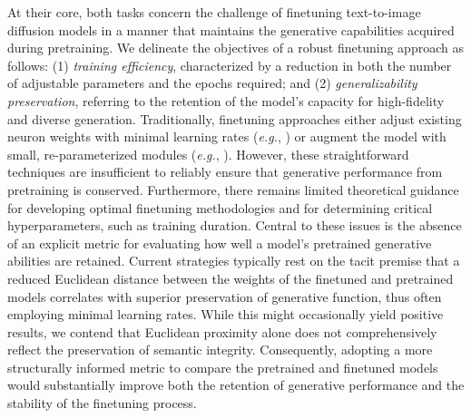 At their core, both tasks concern the challenge of finetuning text-to-image diffusion models in a manner that maintains the generative capabilities acquired during pretraining. We delineate the objectives of a robust finetuning approach as follows: (1) \emph{training efficiency}, characterized by a reduction in both the number of adjustable parameters and the epochs required; and (2) \emph{generalizability preservation}, referring to the retention of the model’s capacity for high-fidelity and diverse generation. Traditionally, finetuning approaches either adjust existing neuron weights with minimal learning rates (\emph{e.g.}, \cite{ruiz2023dreambooth}) or augment the model with small, re-parameterized modules (\emph{e.g.}, \cite{hulora2022,zhang2023adding}). However, these straightforward techniques are insufficient to reliably ensure that generative performance from pretraining is conserved. Furthermore, there remains limited theoretical guidance for developing optimal finetuning methodologies and for determining critical hyperparameters, such as training duration. Central to these issues is the absence of an explicit metric for evaluating how well a model’s pretrained generative abilities are retained. Current strategies typically rest on the tacit premise that a reduced Euclidean distance between the weights of the finetuned and pretrained models correlates with superior preservation of generative function, thus often employing minimal learning rates. While this might occasionally yield positive results, we contend that Euclidean proximity alone does not comprehensively reflect the preservation of semantic integrity. Consequently, adopting a more structurally informed metric to compare the pretrained and finetuned models would substantially improve both the retention of generative performance and the stability of the finetuning process.

